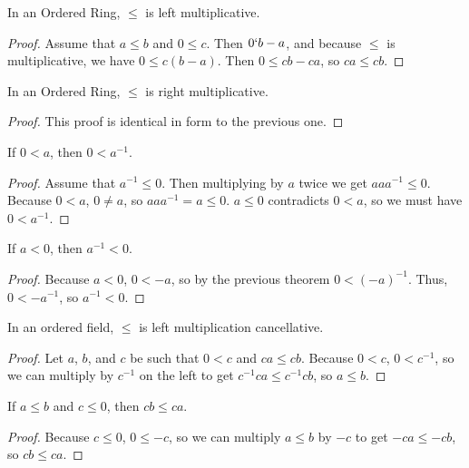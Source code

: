 \documentclass[../math.tex]{subfiles}
\begin{document}
\begin{instance}
    In an Ordered Ring, $\leq$ is left multiplicative.
\end{instance}
\begin{proof}
    Assume that $a \leq b$ and $0 \leq c$.  Then $0 \lq b - a$, and because
    $\leq$ is multiplicative, we have $0 \leq c(b - a)$.  Then $0 \leq cb - ca$,
    so $ca \leq cb$.
\end{proof}

\begin{instance}
    In an Ordered Ring, $\leq$ is right multiplicative.
\end{instance}
\begin{proof}
    This proof is identical in form to the previous one.
\end{proof}

\begin{theorem}
    If $0 < a$, then $0 < a^{-1}$.
\end{theorem}
\begin{proof}
    Assume that $a^{-1} \leq 0$. Then multiplying by $a$ twice we get $aaa^{-1}
    \leq 0$.  Because $0 < a$, $0 \neq a$, so $aaa^{-1} = a \leq 0$.  $a \leq 0$
    contradicts $0 < a$, so we must have $0 < a^{-1}$.
\end{proof}

\begin{theorem}
    If $a < 0$, then $a^{-1} < 0$.
\end{theorem}
\begin{proof}
    Because $a < 0$, $0 < -a$, so by the previous theorem $0 < (-a)^{-1}$.
    Thus, $0 < -a^{-1}$, so $a^{-1} < 0$.
\end{proof}

\begin{instance}
    In an ordered field, $\leq$ is left multiplication cancellative.
\end{instance}
\begin{proof}
    Let $a$, $b$, and $c$ be such that $0 < c$ and $ca \leq cb$.  Because $0 <
    c$, $0 < c^{-1}$, so we can multiply by $c^{-1}$ on the left to get
    $c^{-1}ca \leq c^{-1}cb$, so $a \leq b$.
\end{proof}

\begin{theorem} \label{le-lmult-neg}
    If $a \leq b$ and $c \leq 0$, then $cb \leq ca$.
\end{theorem}
\begin{proof}
    Because $c \leq 0$, $0 \leq -c$, so we can multiply $a \leq b$ by $-c$ to
    get $-ca \leq -cb$, so $cb \leq ca$.
\end{proof}
\end{document}
